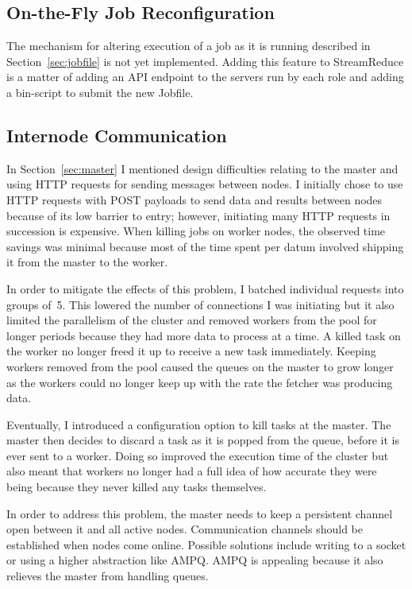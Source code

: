 \documentclass[12pt,twocolumn]{article}
\begin{document}
\subsection{On-the-Fly Job Reconfiguration}
The mechanism for altering execution of a job as it is running described in Section~\ref{sec:jobfile}
is not yet implemented. Adding this feature to StreamReduce is a matter of adding an API endpoint
to the servers run by each role and adding a bin-script to submit the new Jobfile.

\subsection{Internode Communication}
In Section~\ref{sec:master} I mentioned design difficulties relating to the master and using HTTP
requests for sending messages between nodes. I initially chose to use HTTP requests with POST payloads
to send data and results between nodes because of its low barrier to entry; however, initiating many
HTTP requests in succession is expensive. When killing jobs on worker nodes, the observed time savings
was minimal because most of the time spent per datum involved shipping it from the master to the worker.

In order to mitigate the effects of this problem, I batched individual requests into groups of~5. This
lowered the number of connections I was initiating but it also limited the parallelism of the cluster
and removed workers from the pool for longer periods because they had more data to process at a time.
A killed task on the worker no longer freed it up to receive a new task immediately.
Keeping workers removed from the pool caused the queues on the master to grow longer as the workers
could no longer keep up with the rate the fetcher was producing data.

Eventually, I introduced a configuration option to kill tasks at the master. The master then
decides to discard a task as it is popped from the queue, before it is ever sent to a worker.
Doing so improved the execution time of the cluster but also meant that workers no longer had
a full idea of how accurate they were being because they never killed any tasks themselves.

In order to address this problem, the master needs to keep a persistent channel open between
it and all active nodes. Communication channels should be established when nodes come online.
Possible solutions include writing to a socket or using a higher abstraction like AMPQ\@.
AMPQ is appealing because it also relieves the master from handling queues.
\end{document}
